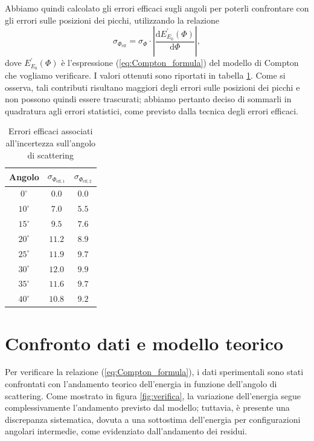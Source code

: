 \documentclass[10pt,twocolumn]{article}
\begin{document}
Abbiamo quindi calcolato gli errori efficaci sugli angoli per poterli confrontare con gli errori sulle posizioni dei picchi, utilizzando la relazione
\begin{equation}
\sigma_{\Phi_{\text{eff}}} = \sigma_\Phi \cdot \left|\frac{\mathrm{d} E_{E_0}^\prime(\Phi)}{\mathrm{d} \Phi}\right|,
\label{eq:phi_eff}
\end{equation}
dove $E_{E_0}^\prime(\Phi)$ è l'espressione (\ref{eq:Compton_formula}) del modello di Compton che vogliamo verificare. I valori ottenuti sono riportati in tabella \ref{tab:err_eff}. Come si osserva, tali contributi risultano maggiori degli errori sulle posizioni dei picchi e non possono quindi essere trascurati; abbiamo pertanto deciso di sommarli in quadratura agli errori statistici, come previsto dalla tecnica degli errori efficaci.

\begin{table}[ht]
\centering
\begin{tabular}{ccc} 
\hline
\noalign{\smallskip}
Angolo & ${\sigma}_{\Phi_{\text{eff},1}}$ & ${\sigma}_{\Phi_{\text{eff},2}}$ \\ [0.5ex] 
\hline
\noalign{\smallskip}
$0^\circ$ 	& $0.0$ 		& $0.0$ \\
$10^\circ$ 	& $7.0$ 		& $5.5$ \\
$15^\circ$ 	& $9.5$ 		& $7.6$ \\
$20^\circ$ 	& $11.2$ 		& $8.9$ \\
$25^\circ$ 	& $11.9$ 		& $9.7$ \\
$30^\circ$ 	& $12.0$ 		& $9.9$ \\
$35^\circ$ 	& $11.6$ 		& $9.7$ \\
$40^\circ$ 	& $10.8$ 		& $9.2$ \\
\hline
\end{tabular}
\caption{Errori efficaci associati all'incertezza sull'angolo di scattering}
\label{tab:err_eff}
\end{table}

\section{Confronto dati e modello teorico}
\label{sec:confronto}

Per verificare la relazione (\ref{eq:Compton_formula}), i dati sperimentali sono stati confrontati con l'andamento teorico dell'energia in funzione dell'angolo di scattering. Come mostrato in figura \ref{fig:verifica}, la variazione dell'energia segue complessivamente l'andamento previsto dal modello; tuttavia, è presente una discrepanza sistematica, dovuta a una sottostima dell'energia per configurazioni angolari intermedie, come evidenziato dall'andamento dei residui.
\end{document}
